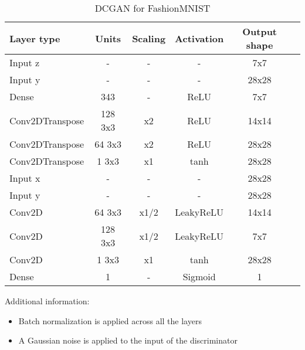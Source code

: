 \begin{table*}[h!]
	\centering
	\begin{tabular}{|l|c|c|c|c|c|}
		\hline
		Layer type & Units & Scaling & Activation & Output shape\\
		\hline
		Input z & - & - & - & 7x7\\
		Input y & - & - & - & 28x28\\
		Dense & 343 & - & ReLU & 7x7\\
		Conv2DTranspose & 128 3x3 & x2 & ReLU & 14x14 \\
		Conv2DTranspose & 64 3x3 & x2 & ReLU & 28x28 \\
		Conv2DTranspose & 1 3x3 & x1 & tanh & 28x28 \\
		\hline
		Input x & - & - & - & 28x28\\
		Input y & - & - & - & 28x28\\
		Conv2D & 64 3x3 & x1/2 & LeakyReLU & 14x14 \\
		Conv2D & 128 3x3 & x1/2 & LeakyReLU & 7x7 \\
		Conv2D & 1 3x3 & x1 & tanh & 28x28 \\
		Dense & 1 & - & Sigmoid & 1\\
		\hline
	\end{tabular}
	\caption{DCGAN for FashionMNIST}
\end{table*}

Additional information: \begin{itemize}
	\item Batch normalization \citep{Ioffe2015} is applied across all the layers
	\item A Gaussian noise is applied to the input of the discriminator
\end{itemize}


